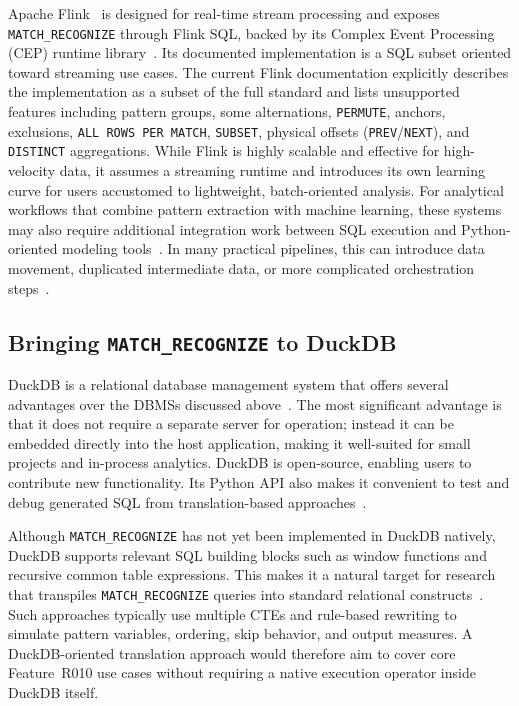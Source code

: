 Apache Flink~\cite{vsprem2024building,georgiou2025streaming} is
designed for real-time stream processing and exposes
\texttt{MATCH\_\allowbreak RECOGNIZE} through Flink SQL, backed by
its Complex Event Processing (CEP) runtime library~\cite{flink}.
Its documented implementation is a SQL subset oriented toward
streaming use cases.  The current Flink documentation explicitly
describes the implementation as a subset of the full standard and
lists unsupported features including pattern groups, some
alternations, \texttt{PERMUTE}, anchors, exclusions,
\texttt{ALL ROWS PER MATCH}, \texttt{SUBSET}, physical offsets
(\texttt{PREV}/\texttt{NEXT}), and \texttt{DISTINCT}
aggregations.  While Flink is highly scalable and effective for
high-velocity data, it assumes a streaming runtime and introduces
its own learning curve for users accustomed to lightweight,
batch-oriented analysis.
For analytical workflows that combine pattern extraction with
machine learning, these systems may also require additional
integration work between SQL execution and Python-oriented modeling
tools~\cite{ML_Workflow,Makrynioti2019sql4mlAD}.  In many practical
pipelines, this can introduce data movement, duplicated
intermediate data, or more complicated orchestration
steps~\cite{naphade2025evolution}.

\subsection{Bringing \texttt{MATCH\_RECOGNIZE} to DuckDB}
\label{subsec:related-duckdb}

DuckDB is a relational database management system that offers
several advantages over the DBMSs discussed
above~\cite{raasveldt2019duckdb}.
The most significant advantage is that it does not require a
separate server for operation; instead it can be embedded directly
into the host application, making it well-suited for small projects
and in-process analytics.
DuckDB is open-source, enabling users to contribute new
functionality.  Its Python API also makes it convenient to test and
debug generated SQL from translation-based
approaches~\cite{raasveldt2019duckdb}.

Although \texttt{MATCH\_RECOGNIZE} has not yet been implemented in
DuckDB natively, DuckDB supports relevant SQL building blocks such
as window functions and recursive common table expressions.  This
makes it a natural target for research that transpiles
\texttt{MATCH\_RECOGNIZE} queries into standard relational
constructs~\cite{findling2025bringing,mogensen2024compiler,TURP2,TURP}.
Such approaches typically use multiple CTEs and rule-based
rewriting to simulate pattern variables, ordering, skip behavior,
and output measures.  A DuckDB-oriented translation approach would
therefore aim to cover core Feature~R010 use cases without requiring
a native execution operator inside DuckDB itself.

